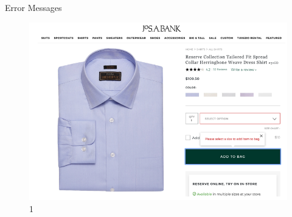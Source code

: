 \documentclass{beamer}
\begin{document}
\begin{frame}[t]{Error Messages}
	\begin{figure}[h]
		\centering
		\includegraphics[scale=0.6]{images/lec08-pic66.png}
		\caption{1}
	\end{figure}
\end{frame}
\end{document}
